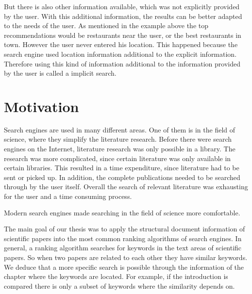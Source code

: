 But there is also other information available, which was not explicitly provided by the user. With this additional information, the results can be better adapted to the needs of the user. As mentioned in the example above the top recommendations would be restaurants near the user, or the best restaurants in town. However the user never entered his location. This happened because the search engine used location information additional to the explicit information. Therefore using this kind of information additional to the information provided by the user is called a implicit search.

\section{Motivation}
\label{sec:Motivation}

Search engines are used in many different areas. One of them is in the field of science, where they simplify the literature research. Before there were search engines on the Internet, literature research was only possible in a library. The research was more complicated, since certain literature was only available in certain libraries. This resulted in a time expenditure, since literature had to be sent or picked up. In addition, the complete publications needed to be searched through by the user itself. Overall the search of relevant literature was exhausting for the user and a time consuming process.

Modern search engines made searching in the field of science more comfortable. %




The main goal of our thesis was to apply the structural document information of scientific papers into the most common ranking algorithms of search engines. In general, a ranking algorithm searches for keywords in the text areas of scientific papers. So when two papers are related to each other they have similar keywords. We deduce that a more specific search is possible through the information of the chapter where the keywords are located. For example, if the introduction is compared there is only a subset of keywords where the similarity depends on.

